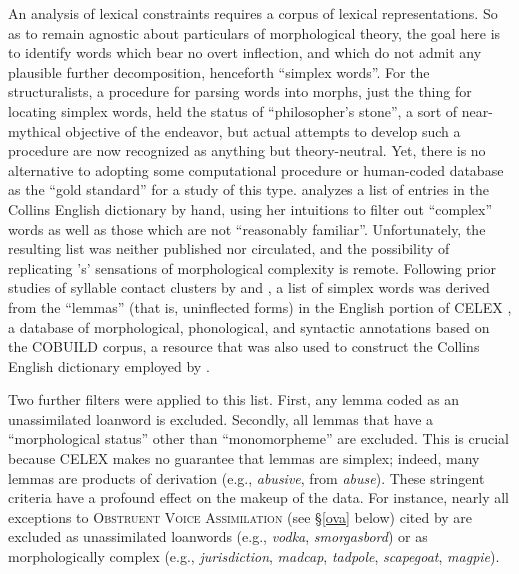 An analysis of lexical constraints requires a corpus of lexical representations. So as to remain agnostic about particulars of morphological theory, the goal here is to identify words which bear no overt inflection, and which do not admit any plausible further decomposition, henceforth ``simplex words''. For the structuralists, a procedure for parsing words into morphs, just the thing for locating simplex words, held the status of ``philosopher's stone'', a sort of near-mythical objective of the endeavor, but actual attempts to develop such a procedure \citep[e.g.,][]{Harris1955,Nida1948} are now recognized as anything but theory-neutral. Yet, there is no alternative to adopting some computational procedure or human-coded database as the ``gold standard'' for a study of this type. \citet{Pierrehumbert1994} analyzes a list of entries in the Collins English dictionary by hand, using her intuitions to filter out ``complex'' words as well as those which are not ``reasonably familiar''. Unfortunately, the resulting list was neither published nor circulated, and the possibility of replicating \citeauthor{Pierrehumbert1994}'s' sensations of morphological complexity is remote. Following prior studies of syllable contact clusters by \citet[ chapter 3]{Hammond1999a} and \citet[ chapter 8]{Duanmu2009}, a list of simplex words was derived from the ``lemmas'' (that is, uninflected forms) in the English portion of CELEX \citep{CELEX}, a database of morphological, phonological, and syntactic annotations based on the COBUILD corpus, a resource that was also used to construct the Collins English dictionary employed by \citeauthor{Pierrehumbert1994}.

Two further filters were applied to this list. First, any lemma coded as an unassimilated loanword is excluded. Secondly, all lemmas that have a ``morphological status'' other than ``monomorpheme'' are excluded. This is crucial because CELEX makes no guarantee that lemmas are simplex; indeed, many lemmas are products of derivation (e.g., \emph{abusive}, from \emph{abuse}). These stringent criteria have a profound effect on the makeup of the data. For instance, nearly all exceptions to \textsc{Obstruent Voice Assimilation} (see \S\ref{ova} below) cited by \citet[74]{Hammond1999a} are excluded as unassimilated loanwords (e.g., \emph{vodka}, \emph{smorgasbord}) or as morphologically complex (e.g., \emph{jurisdiction}, \emph{madcap}, \emph{tadpole}, \emph{scapegoat}, \emph{magpie}). 

